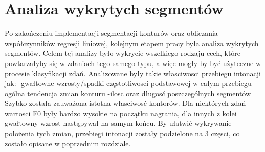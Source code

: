 \documentclass[a4paper,12 pt]{article}
\begin{document}
\section{Analiza wykrytych segmentów}
Po zakończeniu implementacji segmentacji konturów oraz obliczania współczynników regresji liniowej, kolejnym etapem pracy była analiza wykrytych segmentów. Celem tej analizy było wykrycie wszelkiego rodzaju cech, które powtarzałyby się w zdaniach tego samego typu, a więc mogły by być użyteczne w procesie klasyfikacji zdań. 
Analizowane były takie własciwosci przebiegu intonacji jak:
\newline-gwałtowne wzrosty/spadki częstotliwosci podstawowej w całym przebiegu 
\newline-ogólna tendencja zmian konturu
\newline-ilosc oraz długosć poszczególnych segmentów
\newline Szybko została zauważona istotna własciwosć kontorów. Dla niektórych zdań wartosci F0 były bardzo wysokie na początku nagrania, dla innych z kolei gwałtowny wzrost nastąpywał na samym końcu.
By ułatwić wykrywanie położenia tych zmian, przebiegi intonacji zostały podzielone na 3 częsci, co zostało opisane w poprzednim rozdziale.
\end{document}

